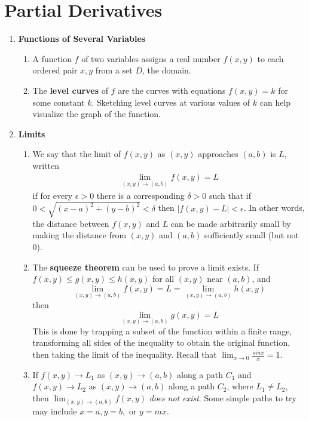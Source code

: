 \documentclass[10pt]{article}
\begin{document}
\begin{multicols}{2}
\begin{enumerate}
\begin{enumerate}
         
    \end{enumerate}
    
    
\end{enumerate}

\section{Partial Derivatives}
\begin{enumerate}
    \item \textbf{Functions of Several Variables}
    \begin{enumerate}
        \item A function $f$ of two variables assigns a real number $f(x,y)$ to each ordered pair $x,y$ from a set $D$, the domain.
        \item The \textbf{level curves} of $f$ are the curves with equations $f(x,y)=k$ for some constant $k$. Sketching level curves at various values of $k$ can help visualize the graph of the function.
    \end{enumerate}
    \item \textbf{Limits}
    \begin{enumerate}
        \item We say that the limit of $f(x,y)$ as $(x,y)$ approaches $(a,b)$ is $L$, written
        \begin{align*}
            \lim_{(x,y) \rightarrow (a,b)} f(x,y) = L
        \end{align*}
        if for every $\epsilon > 0$ there is a corresponding $\delta > 0$ such that if $0 < \sqrt{(x-a)^2 + (y-b)^2} < \delta$ then $|f(x,y) - L| < \epsilon$. In other words, the distance between $f(x,y)$ and $L$ can be made arbitrarily small by making the distance from $(x,y)$ and $(a,b)$ sufficiently small (but not 0).
        
        \item The \textbf{squeeze theorem} can be used to prove a limit exists. If $f(x,y) \leq g(x,y) \leq h(x,y)$  for all $(x,y)$ near $(a,b)$, and $$\lim_{(x,y) \rightarrow (a,b)} f(x,y) = L = \lim_{(x,y) \rightarrow (a,b)} h(x,y)$$ then $$\lim_{(x,y) \rightarrow (a,b)} g(x,y) = L$$ This is done by trapping a subset of the function within a finite range, transforming all sides of the inequality to obtain the original function, then taking the limit of the inequality. Recall that $\lim_{x \rightarrow 0} \frac{sin{x}}{x} = 1$. 
        
        \item If $f(x,y) \rightarrow L_1$ as $(x,y) \rightarrow (a,b)$ along a path $C_1$ and $f(x,y) \rightarrow L_2$ as $(x,y) \rightarrow (a,b)$ along a path $C_2$, where $L_1 \neq L_2$, then $\lim_{(x,y) \rightarrow (a,b)} f(x,y)$ \textit{does not exist}. Some simple paths to try may include $x=a,y=b,$ or $y=mx$.
        

\end{enumerate}
\end{enumerate}
\end{multicols}
\end{document}
